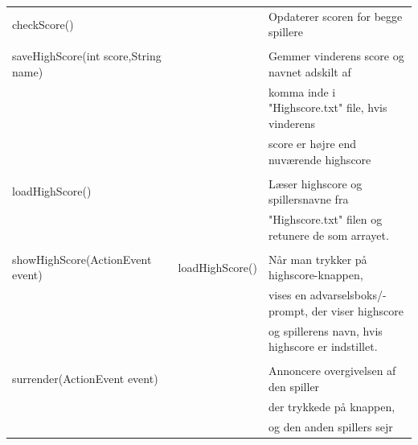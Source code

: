 \begin{table}[H]
\begin{tabular}{lll}
        checkScore()                         &                 & Opdaterer scoren for begge spillere                       \\
                                             &                 &                                                           \\
        saveHighScore(int score,String name) &                 & Gemmer vinderens score og navnet adskilt af               \\
                                             &                 & komma inde i "Highscore.txt" file, hvis vinderens         \\
                                             &                 & score er højre end nuværende highscore                    \\
                                             &                 &                                                           \\
        loadHighScore()                      &                 & Læser highscore og spillersnavne fra                      \\
                                             &                 & "Highscore.txt" filen og retunere de som arrayet.         \\
                                             &                 &                                                           \\
        showHighScore(ActionEvent event)     & loadHighScore() & Når man trykker på highscore-knappen,                     \\
                                             &                 & vises en advarselsboks/-prompt, der viser highscore       \\
                                             &                 & og spillerens navn, hvis highscore er indstillet.         \\
                                             &                 &                                                           \\
        surrender(ActionEvent event)         &                 & Annoncere overgivelsen af den spiller                     \\
                                             &                 & der trykkede på knappen,                                  \\
                                             &                 & og den anden spillers sejr                                \\

\end{tabular}
\end{table}
